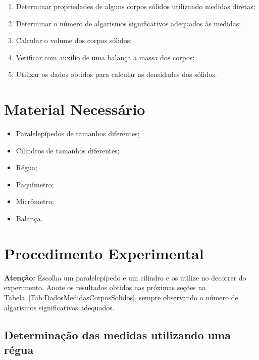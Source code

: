 \begin{enumerate}
     \item Determinar propriedades de alguns corpos sólidos utilizando medidas diretas;
     \item Determinar o número de algarismos significativos adequados às medidas;
     \item Calcular o volume dos corpos sólidos;
     \item Verificar com auxílio de uma balança a massa dos corpos;
     \item Utilizar os dados obtidos para calcular as densidades dos sólidos.
\end{enumerate}

\section{Material Necessário}

\begin{itemize}
	\item Paralelepípedos de tamanhos diferentes;
	\item Cilindros de tamanhos diferentes;
	\item Régua;
	\item Paquímetro;
	\item Micrômetro;
	\item Balança.
\end{itemize}

\section{Procedimento Experimental}

\textbf{Atenção:} Escolha um paralelepípedo e um cilindro e os utilize no decorrer do experimento. Anote os resultados obtidos nas próximas seções na Tabela~\ref{Tab:DadosMedidasCorposSolidos}, sempre observando o número de algarismos significativos adequados.

\subsection{Determinação das medidas utilizando uma régua}

